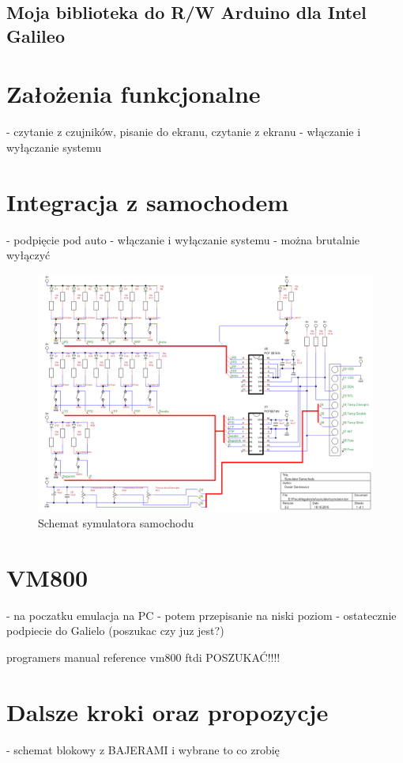 \documentclass{xmgr}
\begin{document}
\subsection{Moja biblioteka do R/W Arduino dla Intel Galileo}
\section{Założenia funkcjonalne}
 - czytanie z czujników, pisanie do ekranu, czytanie z ekranu
 - włączanie i wyłączanie systemu
\section{Integracja z samochodem}
 - podpięcie pod auto
 - włączanie i wyłączanie systemu - można brutalnie wyłączyć
 
 \begin{figure}[!htb]
    \centering
    \includegraphics[height=0.4\textheight]{images/symulator.png}
    \caption{Schemat symulatora samochodu\label{SchematSymulatora}}
\end{figure}

\section{VM800}
  - na poczatku emulacja na PC
  - potem przepisanie na niski poziom
  - ostatecznie podpiecie do Galielo (poszukac czy juz jest?)
  
   programers manual reference vm800 ftdi POSZUKAĆ!!!!

\section{Dalsze kroki oraz propozycje}
- schemat blokowy z BAJERAMI i wybrane to co zrobię
\end{document}

